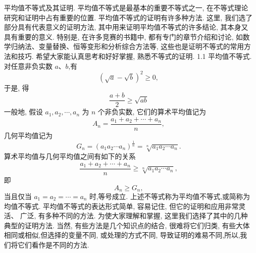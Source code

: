 
平均值不等式及其证明.
平均值不等式是最基本的重要不等式之一, 在不等式理论研究和证明中占有重要的位置.
平均值不等式的证明有许多种方法.
这里, 我们选了部分具有代表意义的证明方法, 其中用来证明平均值不等式的许多结论, 其本身又具有重要的意义.
特别是, 在许多竞赛的书籍中, 都有专门的章节介绍和讨论, 如数学归纳法、变量替换、恒等变形和分析综合方法等, 这些也是证明不等式的常用方法和技巧.
希望大家能认真思考和好好掌握, 熟悉不等式的证明.
1.1 平均值不等式.
对任意非负实数 $a 、 b$,有
$$
(\sqrt{a}-\sqrt{b})^2 \geqslant 0,
$$
于是, 得
$$
\frac{a+b}{2} \geqslant \sqrt{a b}
$$
一般地, 假设 $a_1, a_2, \cdots, a_n$ 为 $n$ 个非负实数, 它们的算术平均值记为
$$
A_n=\frac{a_1+a_2+\cdots+a_n}{n},
$$
几何平均值记为
$$
G_n=\left(a_1 a_2 \cdots a_n\right)^{\frac{1}{n}}=\sqrt[n]{a_1 a_2 \cdots a_n} .
$$
算术平均值与几何平均值之间有如下的关系
$$
\frac{a_1+a_2+\cdots+a_n}{n} \geqslant \sqrt[n]{a_1 a_2 \cdots a_n},
$$
即
$$
A_n \geqslant G_n,
$$
当且仅当 $a_1=a_2=\cdots=a_n$ 时,等号成立.
上述不等式称为平均值不等式,或简称为均值不等式.
平均值不等式的表达形式简单, 容易记住, 但它的证明和应用非常灵活、 广泛, 有多种不同的方法.
为使大家理解和掌握, 这里我们选择了其中的几种典型的证明方法.
当然, 有些方法是几个知识点的结合, 很难将它们归类, 有些大体相同或相似,但选择的变量不同, 或处理的方式不同, 导致证明的难易不同,所以,我们将它们看作是不同的方法.



